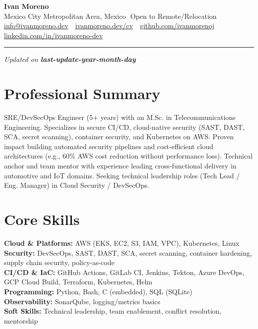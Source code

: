 \documentclass[11pt,a4paper]{article}
\newcommand{\sep}{\,\textbar\,}
\newcommand{\skillcat}[2]{\textbf{#1:} #2\\}
\begin{document}
{\LARGE \textbf{Ivan Moreno}}\\[2pt]
\small Mexico City Metropolitan Area, Mexico \sep Open to Remote/Relocation\\
\small \href{mailto:info@ivanmoreno.dev}{info@ivanmoreno.dev} \sep 
\href{https://ivanmoreno.dev/cv}{ivanmoreno.dev/cv} \sep 
\href{https://github.com/ivanmorenoj}{github.com/ivanmorenoj} \sep 
\href{https://www.linkedin.com/in/ivanmoreno-dev}{linkedin.com/in/ivanmoreno-dev}

\vspace{6pt}
\hrule
\vspace{6pt}

\vspace{-18pt} \null \hfill {\tiny \textit{Updated on \textbf{last-update-year-month-day}}}

\section*{Professional Summary}
SRE/DevSecOps Engineer (5+ years) with an M.Sc. in Telecommunications Engineering. Specializes in secure CI/CD, cloud-native security (SAST, DAST, SCA, secret scanning), container security, and Kubernetes on AWS. Proven impact building automated security pipelines and cost-efficient cloud architectures (e.g., 60\% AWS cost reduction without performance loss). Technical anchor and team mentor with experience leading cross-functional delivery in automotive and IoT domains. Seeking technical leadership roles (Tech Lead / Eng. Manager) in Cloud Security / DevSecOps.

\section*{Core Skills}
\skillcat{Cloud \& Platforms}{AWS (EKS, EC2, S3, IAM, VPC), Kubernetes, Linux}
\skillcat{Security}{DevSecOps, SAST, DAST, SCA, secret scanning, container hardening, supply chain security, policy-as-code}
\skillcat{CI/CD \& IaC}{GitHub Actions, GitLab CI, Jenkins, Tekton, Azure DevOps, GCP Cloud Build, Terraform, Kubernetes, Helm}
\skillcat{Programming}{Python, Bash, C (embedded), SQL (SQLite)}
\skillcat{Observability}{SonarQube, logging/metrics basics}
\skillcat{Soft Skills}{Technical leadership, team enablement, conflict resolution, mentorship}

\end{document}
